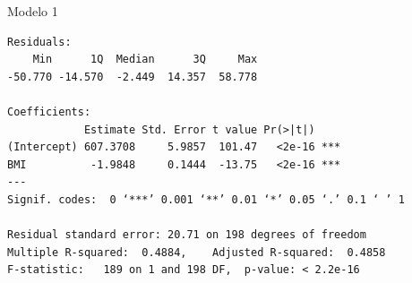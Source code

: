 \documentclass{beamer}
\begin{document}
\begin{frame}[fragile]{}
  \begin{center}
    \begin{exampleblock}{Modelo 1}
      \tiny
\begin{verbatim}
Residuals:
    Min      1Q  Median      3Q     Max 
-50.770 -14.570  -2.449  14.357  58.778 

Coefficients:
            Estimate Std. Error t value Pr(>|t|)    
(Intercept) 607.3708     5.9857  101.47   <2e-16 ***
BMI          -1.9848     0.1444  -13.75   <2e-16 ***
---
Signif. codes:  0 ‘***’ 0.001 ‘**’ 0.01 ‘*’ 0.05 ‘.’ 0.1 ‘ ’ 1

Residual standard error: 20.71 on 198 degrees of freedom
Multiple R-squared:  0.4884,	Adjusted R-squared:  0.4858 
F-statistic:   189 on 1 and 198 DF,  p-value: < 2.2e-16
\end{verbatim}
    \end{exampleblock}
  \end{center}
\end{frame}
\end{document}
